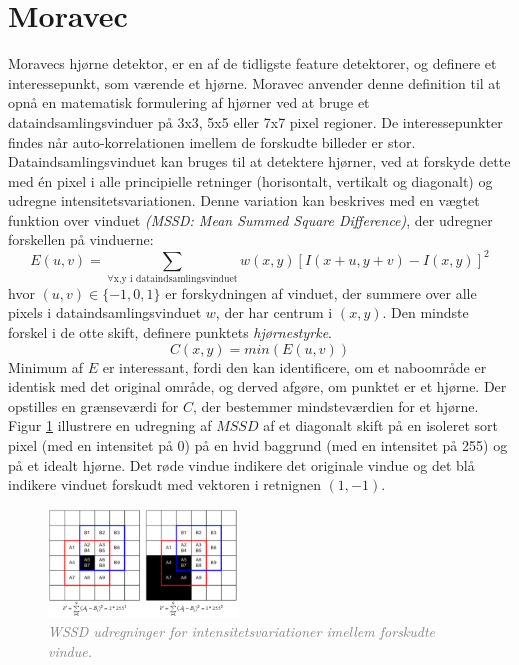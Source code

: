 \section{Moravec}\label{sec:moravec}
Moravecs hjørne detektor\cite{moravec}, er en af de tidligste feature detektorer, og definere et interessepunkt, som værende et hjørne. Moravec anvender denne definition til at opnå en matematisk formulering af hjørner ved at bruge et dataindsamlingsvinduer på 3x3, 5x5 eller 7x7 pixel regioner. De interessepunkter findes når auto-korrelationen imellem de forskudte billeder er stor. Dataindsamlingsvinduet kan bruges til at detektere hjørner, ved at forskyde  dette med én pixel i alle principielle retninger (horisontalt, vertikalt og diagonalt) og udregne intensitetsvariationen. Denne variation kan beskrives med en vægtet funktion over vinduet  \emph{(MSSD: Mean Summed Square Difference)}, der udregner forskellen på vinduerne:
\begin{equation}
E(u,v)= \sum_{\forall \text{x,y i dataindsamlingsvinduet}} w(x,y)[I(x+u,y+v) - I(x,y)]^2
\label{moravec}     
\end{equation}
hvor $(u,v)\in \lbrace -1,0,1 \rbrace$ er forskydningen af vinduet, der summere over alle pixels i dataindsamlingsvinduet $w$, der har centrum i $(x,y)$. Den mindste forskel i de otte skift, definere punktets \textit{hjørnestyrke}.
$$
C(x,y)=min(E(u,v))
$$
Minimum af $E$ er interessant, fordi den kan identificere, om et naboområde er identisk med det original område, og derved afgøre, om punktet er et hjørne. Der opstilles en grænseværdi for $C$, der bestemmer mindsteværdien for et hjørne. Figur \ref{fig:moravec} illustrere en udregning af $MSSD$ af et diagonalt skift på en isoleret sort pixel (med en intensitet på 0) på en hvid baggrund (med en intensitet på 255) og på et idealt hjørne. Det røde vindue indikere det originale vindue og det blå indikere  vinduet forskudt med vektoren i retnignen $(1,-1)$. 
\begin{figure}[H]
    \centering
    \includegraphics[width=0.45\textwidth]{fig/25.png}
     \vspace{-1em}
    \begin{center}    
       \caption{\textcolor{gray}{\footnotesize \textit{ WSSD udregninger for intensitetsvariationer imellem forskudte vindue. }}}
    \label{fig:moravec}
     \end{center}
     \vspace{-2.5em}
  \end{figure} \noindent
